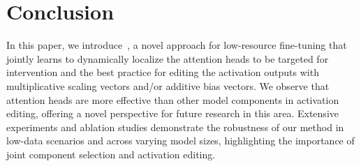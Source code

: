 \section{Conclusion}
\label{sec:conclusion}
In this paper, we introduce~\jola{}, a novel approach for low-resource fine-tuning that jointly learns to dynamically localize the attention heads to be targeted for intervention and the best practice for editing the activation outputs with multiplicative scaling vectors and/or additive bias vectors.
We observe that attention heads are more effective than other model components in activation editing, offering a novel perspective for future research in this area.
Extensive experiments and ablation studies demonstrate the robustness of our method in low-data scenarios and across varying model sizes, highlighting the importance of joint component selection and activation editing.